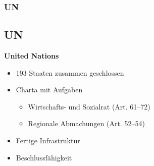 \documentclass[]{beamer}
\begin{document}
	 \begin{frame}
	\frametitle{UN} 
	\subsection{UN}
	\textbf{United Nations}
	\begin{itemize}
		\item 193 Staaten zusammen geschlossen
		\item Charta mit Aufgaben
		\begin{itemize}
			\item Wirtschafts- und Sozialrat (Art. 61–72)
			\item Regionale Abmachungen (Art. 52–54)
		\end{itemize}
		\item Fertige Infrastruktur
		\item Beschlussfähigkeit
	\end{itemize}
	
\end{frame}
\end{document}
